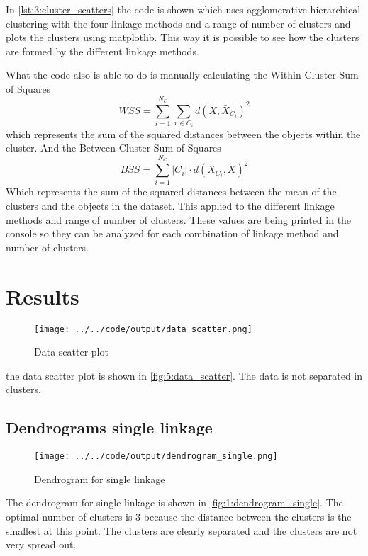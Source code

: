 \documentclass[twoside, a4paper, fleqn, reqno]{article}
\begin{document}
In \autoref{lst:3:cluster_scatters} the code is shown which uses agglomerative hierarchical clustering
with the four linkage methods and a range of number of clusters and plots the clusters using matplotlib.
This way it is possible to see how the clusters are formed by the different linkage methods.
\par
What the code also is able to do is manually calculating the Within Cluster Sum of Squares
\begin{equation*}
	WSS= \sum_{i = 1}^{N_C} \sum_{x \in C_i} d(X, \bar{X}_{C_i} )^2
\end{equation*}
which represents the sum of the squared distances between the objects within the cluster. 
And the Between Cluster Sum of Squares
\begin{equation*}
	BSS= \sum_{i = 1}^{N_C} \left\lvert C_i \right\rvert \cdot d(\bar{X}_{C_i},X)^2
\end{equation*}
Which represents the sum of the squared distances between the mean of the clusters and the objects in the dataset.
This applied to the different linkage methods and range of number of clusters.
These values are being printed in the console so they can be analyzed for each combination
of linkage method and number of clusters.

\section{Results}

\begin{figure}[H]
	\centering
	\texttt{[image: ../../code/output/data\_scatter.png]}
	\caption{Data scatter plot}
	\label{fig:5:data_scatter}
\end{figure}

the data scatter plot is shown in \autoref{fig:5:data_scatter}.
The data is not separated in clusters.

\subsection{Dendrograms single linkage}

\begin{figure}[H]
	\centering
	\texttt{[image: ../../code/output/dendrogram\_single.png]}
	\caption{Dendrogram for single linkage}
	\label{fig:1:dendrogram_single}
\end{figure}

The dendrogram for single linkage is shown in \autoref{fig:1:dendrogram_single}.
The optimal number of clusters is 3 because the distance between the clusters is the smallest at this point.
The clusters are clearly separated and the clusters are not very spread out.
\end{document}
